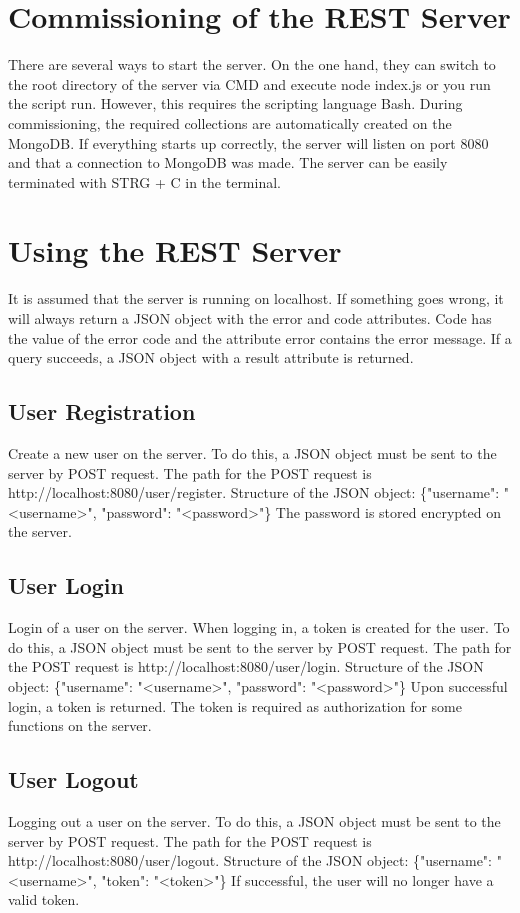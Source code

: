 \documentclass[12pt]{scrartcl}
\begin{document}
    \section{Commissioning of the REST Server}
        There are several ways to start the server.
        On the one hand, they can switch to the root directory of the server via CMD and execute node index.js or
        you run the script run. However, this requires the scripting language Bash.
        During commissioning, the required collections are automatically created on the MongoDB.
        If everything starts up correctly, the server will listen on port 8080
        and that a connection to MongoDB was made.
        The server can be easily terminated with STRG + C in the terminal.
    \section{Using the REST Server}
        It is assumed that the server is running on localhost.
        If something goes wrong, it will always return a JSON object with the error and code attributes.
        Code has the value of the error code and the attribute error contains the error message.
        If a query succeeds, a JSON object with a result attribute is returned.
    \subsection{User Registration}
        Create a new user on the server.
        To do this, a JSON object must be sent to the server by POST request. The path for the POST request is
        {http://localhost:8080/user/register}.
        Structure of the JSON object: \{"username": "<username>", "password": "<password>"\}
        The password is stored encrypted on the server.

    \subsection{User Login}
        Login of a user on the server. When logging in, a token is created for the user.
        To do this, a JSON object must be sent to the server by POST request. The path for the POST request is
        {http://localhost:8080/user/login}.
        Structure of the JSON object: \{"username": "<username>", "password": "<password>"\}
        Upon successful login, a token is returned. The token is required as authorization for some functions on the server.
    
    \subsection{User Logout}
        Logging out a user on the server.
        To do this, a JSON object must be sent to the server by POST request. The path for the POST request is
        {http://localhost:8080/user/logout}.
        Structure of the JSON object: \{"username": "<username>", "token": "<token>"\}
        If successful, the user will no longer have a valid token.
\end{document}
